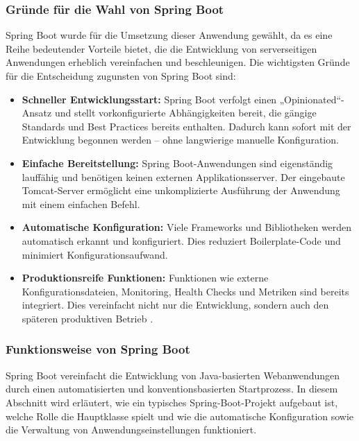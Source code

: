 \subsubsection{Gründe für die Wahl von Spring Boot}
Spring Boot wurde für die Umsetzung dieser Anwendung gewählt, da es eine Reihe bedeutender Vorteile bietet, die die Entwicklung von serverseitigen Anwendungen erheblich vereinfachen und beschleunigen. Die wichtigsten Gründe für die Entscheidung zugunsten von Spring Boot sind:
\begin{itemize}
	\item \textbf{Schneller Entwicklungsstart:} Spring Boot verfolgt einen „Opinionated“-Ansatz und stellt vorkonfigurierte Abhängigkeiten bereit, die gängige Standards und Best Practices bereits enthalten. Dadurch kann sofort mit der Entwicklung begonnen werden – ohne langwierige manuelle Konfiguration.
	
	\item \textbf{Einfache Bereitstellung:} Spring Boot-Anwendungen sind eigenständig lauffähig und benötigen keinen externen Applikationsserver. Der eingebaute Tomcat-Server ermöglicht eine unkomplizierte Ausführung der Anwendung mit einem einfachen Befehl.
	
	\item \textbf{Automatische Konfiguration:} Viele Frameworks und Bibliotheken werden automatisch erkannt und konfiguriert. Dies reduziert Boilerplate-Code und minimiert Konfigurationsaufwand.
	
	\item \textbf{Produktionsreife Funktionen:} Funktionen wie externe Konfigurationsdateien, Monitoring, Health Checks und Metriken sind bereits integriert. Dies vereinfacht nicht nur die Entwicklung, sondern auch den späteren produktiven Betrieb \cite{Spring-Framework:o.J}.
\end{itemize}

\subsubsection{Funktionsweise von Spring Boot}
Spring Boot vereinfacht die Entwicklung von Java-basierten Webanwendungen durch einen automatisierten und konventionsbasierten Startprozess. In diesem Abschnitt wird erläutert, wie ein typisches Spring-Boot-Projekt aufgebaut ist, welche Rolle die Hauptklasse spielt und wie die automatische Konfiguration sowie die Verwaltung von Anwendungseinstellungen funktioniert.

